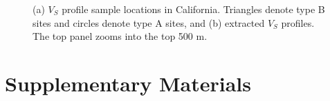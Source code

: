 \clearpage
{}
\begin{figure}[!ht]
   \hfil
  \caption{ (a) $V_S$ profile sample locations in California. Triangles denote type B sites and circles denote type A sites, and (b) extracted $V_S$ profiles. The top panel zooms into the top 500 m. }
  \label{fig:vs30-14}
\end{figure}


\setcounter{table}{0}
\setcounter{figure}{0}
\renewcommand{\thetable}{S\arabic{chapter}.\arabic{table}}
\renewcommand{\thefigure}{S\arabic{chapter}.\arabic{figure}}
\newpage
\section*{Supplementary Materials}



